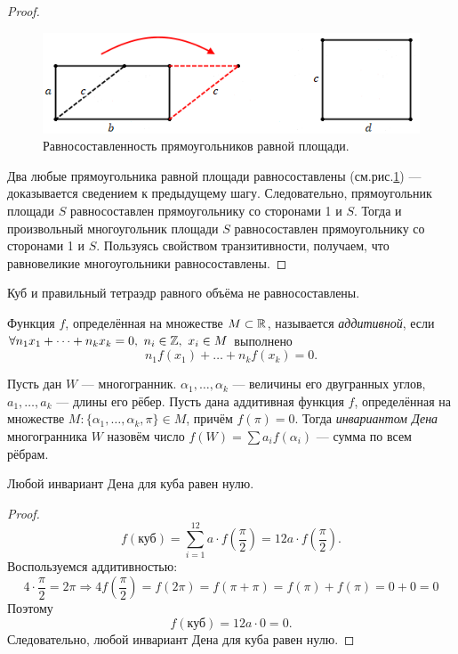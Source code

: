 \begin{proof}
    \begin{figure}[H]
        \centering
        \includegraphics[scale=0.7]{images/c8.3.png}
        \caption{Равносоставленность прямоугольников равной площади.}
        \label{fig:c8.3}
    \end{figure}

    Два любые прямоугольника равной площади равносоставлены (см.рис.\ref{fig:c8.3}) — доказывается сведением к предыдущему шагу. Следовательно, прямоугольник площади $S$ равносоставлен прямоугольнику со сторонами 1 и $S$. Тогда и произвольный многоугольник площади $S$ равносоставлен прямоугольнику со сторонами 1 и $S$. Пользуясь свойством транзитивности, получаем, что равновеликие многоугольники равносоставлены.
\end{proof}


\begin{theorem}[Ден]
    Куб и правильный тетраэдр равного объёма не равносоставлены.
\end{theorem}

\begin{definition}
    Функция $f$, определённая на множестве $M \subset \mathbb{R}$, называется \textit{аддитивной}, если $\forall n_1 x_1 + \dots + n_k x_k = 0, \ n_i \in \mathbb{Z}, \ x_i \in M$ выполнено $$n_1 f(x_1) + \dots + n_k f(x_k) = 0.$$ 
\end{definition}

\begin{definition}
    Пусть дан $W$ — многогранник. $\alpha_1, \dots, \alpha_k$ — величины его двугранных углов, $a_1, \dots, a_k$ — длины его рёбер. Пусть дана аддитивная функция $f$, определённая на множестве $M: \{\alpha_1, \dots, \alpha_k, \pi\} \in M$, причём $f(\pi) = 0$. Тогда \textit{инвариантом Дена} многогранника $W$ назовём число $f(W) = \sum a_i f(\alpha_i)$ — сумма по всем рёбрам.
\end{definition}

\begin{statement}
    Любой инвариант Дена для куба равен нулю.
\end{statement}
\begin{proof}
    \[f(\text{куб}) = \sum_{i = 1}^{12} a \cdot f\left(\frac{\pi}2\right) = 12 a \cdot f\left(\frac{\pi}2\right).\]
    Воспользуемся аддитивностью: 
    \[4 \cdot \frac{\pi}2 = 2 \pi \Longrightarrow 4 f\left(\frac{\pi}2\right) = f(2 \pi) = f(\pi + \pi) = f(\pi) + f(\pi) = 0 + 0 = 0\]
    Поэтому \[f(\text{куб}) = 12 a \cdot 0 = 0.\]
    Следовательно, любой инвариант Дена для куба равен нулю.
\end{proof}

